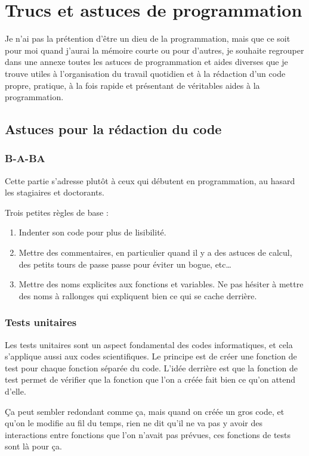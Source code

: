 \chapter{Trucs et astuces de programmation}
Je n'ai pas la prétention d'être un dieu de la programmation, mais que ce soit pour moi quand j'aurai la mémoire courte ou pour d'autres, je souhaite regrouper dans une annexe toutes les astuces de programmation et aides diverses que je trouve utiles à l'organisation du travail quotidien et à la rédaction d'un code propre, pratique, à la fois rapide et présentant de véritables aides à la programmation. 


\section{Astuces pour la rédaction du code}
\subsection{B-A-BA}
Cette partie s'adresse plutôt à ceux qui débutent en programmation, au hasard les stagiaires et doctorants. 

Trois petites règles de base : 
\begin{enumerate}
\item Indenter son code pour plus de lisibilité.
\item Mettre des commentaires, en particulier quand il y a des astuces de calcul, des petits tours de passe passe pour éviter un bogue, etc\dots
\item Mettre des noms explicites aux fonctions et variables. Ne pas hésiter à mettre des noms à rallonges qui expliquent bien ce qui se cache derrière. 
\end{enumerate}

\subsection{Tests unitaires}
Les tests unitaires sont un aspect fondamental des codes informatiques, et cela s'applique aussi
aux codes scientifiques. Le principe est de créer une fonction de test pour chaque fonction séparée
du code. L'idée derrière est que la fonction de test permet de vérifier que la fonction que l'on a créée fait bien ce qu'on
attend d'elle. 

Ça peut sembler redondant comme ça, mais quand on créée un gros code, et qu'on le modifie au fil du temps, rien ne dit qu'il ne va pas y avoir des interactions entre fonctions que l'on n'avait pas prévues, ces fonctions de tests sont là pour ça. 

